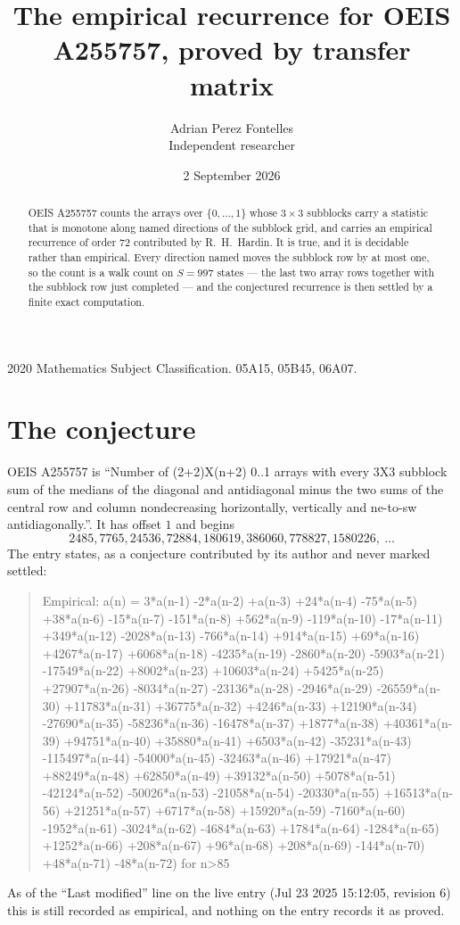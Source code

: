 \documentclass[11pt,a4paper]{article}
\title{The empirical recurrence for OEIS A255757, proved by transfer matrix}
\author{Adrian Perez Fontelles\\ \small Independent researcher}
\date{2 September 2026}
\theoremstyle{plain}
\theoremstyle{definition}
\begin{document}
\maketitle

\begin{abstract}
OEIS A255757 counts the arrays over $\{0,\dots,1\}$ whose $3\times3$ subblocks carry a
statistic that is monotone along named directions of the subblock grid, and carries an
empirical recurrence of order $72$ contributed by R.~H.~Hardin. It is true, and it is
decidable rather than empirical. Every direction named moves the subblock row by at most one,
so the count is a walk count on $S=997$ states --- the last two array rows together with the
subblock row just completed --- and the conjectured recurrence is then settled by a finite
exact computation.
\end{abstract}

\noindent\small 2020 Mathematics Subject Classification. 05A15, 05B45, 06A07.\normalsize

\section{The conjecture}

OEIS A255757 is ``Number of (2+2)X(n+2) 0..1 arrays with every 3X3 subblock sum of the medians of the diagonal and antidiagonal minus the two sums of the central row and column nondecreasing horizontally, vertically and ne-to-sw antidiagonally.''. It has offset $1$ and begins
\[
2485, 7765, 24536, 72884, 180619, 386060, 778827, 1580226,\ \dots
\]
The entry states, as a conjecture contributed by its author and never marked settled:
\begin{quote}
Empirical: a(n) = 3*a(n-1) -2*a(n-2) +a(n-3) +24*a(n-4) -75*a(n-5) +38*a(n-6) -15*a(n-7) -151*a(n-8) +562*a(n-9) -119*a(n-10) -17*a(n-11) +349*a(n-12) -2028*a(n-13) -766*a(n-14) +914*a(n-15) +69*a(n-16) +4267*a(n-17) +6068*a(n-18) -4235*a(n-19) -2860*a(n-20) -5903*a(n-21) -17549*a(n-22) +8002*a(n-23) +10603*a(n-24) +5425*a(n-25) +27907*a(n-26) -8034*a(n-27) -23136*a(n-28) -2946*a(n-29) -26559*a(n-30) +11783*a(n-31) +36775*a(n-32) +4246*a(n-33) +12190*a(n-34) -27690*a(n-35) -58236*a(n-36) -16478*a(n-37) +1877*a(n-38) +40361*a(n-39) +94751*a(n-40) +35880*a(n-41) +6503*a(n-42) -35231*a(n-43) -115497*a(n-44) -54000*a(n-45) -32463*a(n-46) +17921*a(n-47) +88249*a(n-48) +62850*a(n-49) +39132*a(n-50) +5078*a(n-51) -42124*a(n-52) -50026*a(n-53) -21058*a(n-54) -20330*a(n-55) +16513*a(n-56) +21251*a(n-57) +6717*a(n-58) +15920*a(n-59) -7160*a(n-60) -1952*a(n-61) -3024*a(n-62) -4684*a(n-63) +1784*a(n-64) -1284*a(n-65) +1252*a(n-66) +208*a(n-67) +96*a(n-68) +208*a(n-69) -144*a(n-70) +48*a(n-71) -48*a(n-72) for n>85
\end{quote}
As of the ``Last modified'' line on the live entry (Jul 23 2025 15:12:05, revision 6) this is still
recorded as empirical, and nothing on the entry records it as proved.
\end{document}
